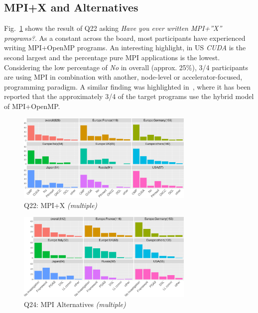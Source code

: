 \documentclass[preprint,5p,times]{elsarticle}
\def\myquote#1{{\it #1}}
\begin{document}
\subsection{MPI+X and Alternatives}

Fig.~\ref{fig:mpi-x} shows the result of Q22 asking \myquote{Have you ever
written MPI+''X'' programs?}. As a constant across the board, most participants
have experienced writing MPI+OpenMP programs. An interesting highlight, in US
\myquote{CUDA} is the second largest and the percentage pure MPI applications is
the lowest. Considering the low percentage of \myquote{No} in overall (approx.
25\%), 3/4 participants are using MPI in combination with another, node-level or
accelerator-focused, programming paradigm. A similar finding was highlighted
in~\cite{10.1145/3295500.3356176}, where it has been reported that the
approximately 3/4 of the target programs use the hybrid model of MPI+OpenMP.

\begin{figure}[htb]
\begin{center}
\includegraphics[width=8.5cm]{R-scripts/Q22.pdf}
\caption{Q22: MPI+X {\it(multiple)}}
\label{fig:mpi-x}
\end{center}
\end{figure}

\begin{figure}[htb]
\begin{center}
\includegraphics[width=8.5cm]{R-scripts/Q24.pdf}
\caption{Q24: MPI Alternatives {\it(multiple)}}
\label{fig:mpi-alternatives}
\end{center}
\end{figure}
\end{document}
